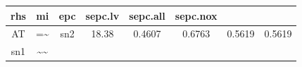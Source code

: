 \documentclass[]{article}
\theoremstyle{definition}
\theoremstyle{definition}
\theoremstyle{definition}
\theoremstyle{remark}
\begin{document}
\begin{longtable}[]{@{}cccccccc@{}}
\begin{minipage}[b]{0.07\columnwidth}
rhs\strut
\end{minipage} & \begin{minipage}[b]{0.09\columnwidth}\centering\strut
mi\strut
\end{minipage} & \begin{minipage}[b]{0.11\columnwidth}\centering\strut
epc\strut
\end{minipage} & \begin{minipage}[b]{0.11\columnwidth}\centering\strut
sepc.lv\strut
\end{minipage} & \begin{minipage}[b]{0.12\columnwidth}\centering\strut
sepc.all\strut
\end{minipage} & \begin{minipage}[b]{0.12\columnwidth}\centering\strut
sepc.nox\strut
\end{minipage}\tabularnewline
\midrule
\endhead
\begin{minipage}[t]{0.07\columnwidth}\centering\strut
AT\strut
\end{minipage} & \begin{minipage}[t]{0.05\columnwidth}\centering\strut
=\textasciitilde{}\strut
\end{minipage} & \begin{minipage}[t]{0.07\columnwidth}\centering\strut
sn2\strut
\end{minipage} & \begin{minipage}[t]{0.09\columnwidth}\centering\strut
18.38\strut
\end{minipage} & \begin{minipage}[t]{0.11\columnwidth}\centering\strut
0.4607\strut
\end{minipage} & \begin{minipage}[t]{0.11\columnwidth}\centering\strut
0.6763\strut
\end{minipage} & \begin{minipage}[t]{0.12\columnwidth}\centering\strut
0.5619\strut
\end{minipage} & \begin{minipage}[t]{0.12\columnwidth}\centering\strut
0.5619\strut
\end{minipage}\tabularnewline
\begin{minipage}[t]{0.07\columnwidth}\centering\strut
sn1\strut
\end{minipage} & \begin{minipage}[t]{0.05\columnwidth}\centering\strut
\textasciitilde{}\textasciitilde{}\strut
\end{minipage} & \begin{minipage}[t]{0.07\columnwidth}\centering\strut

\end{minipage}
\end{longtable}
\end{document}
